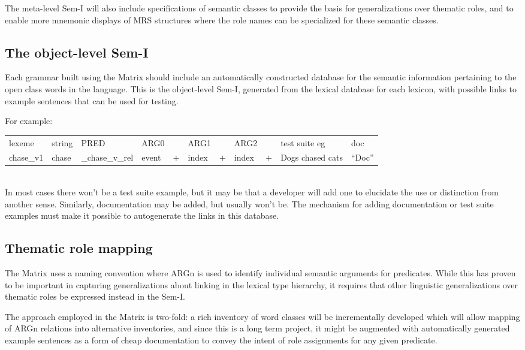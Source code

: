 \documentclass[12pt]{article}
\begin{document}
The meta-level Sem-I will also include specifications of semantic classes
to provide the basis for generalizations over thematic roles, and to enable
more mnemonic displays of MRS structures where the role names can be
specialized for these semantic classes.

\subsection{The object-level Sem-I}

Each grammar built using the Matrix should include an automatically 
constructed database for the semantic information pertaining to the open class 
words in the language.  This is the object-level Sem-I, generated from the 
lexical database for each lexicon, with possible links to example sentences
that can be used for testing.

For example:\\

\noindent
{\small
\begin{tabular}{lllllllllll}
lexeme & string & PRED & ARG0 & & ARG1 & & ARG2 & & test suite eg & doc\\
chase\_v1 & chase & \_chase\_v\_rel & event & $+$ & index & $+$ & index & $+$ & Dogs chased cats & ``Doc''
\end{tabular}
}\\

In most cases there won't be a test suite example, but it may be that a
developer will add one to elucidate the use or distinction from another sense. 
Similarly, documentation may be added, but usually won't be.
The mechanism for adding documentation or test suite examples
must make it possible to autogenerate the links in this database.


\subsection{Thematic role mapping}

The Matrix uses a naming convention where ARGn is used to identify
individual semantic arguments for predicates.  While this has proven to be
important in capturing generalizations about linking in the lexical type
hierarchy, it requires that other linguistic generalizations over thematic
roles be expressed instead in the Sem-I.

The approach employed in the Matrix is two-fold: a rich inventory
of word classes will be incrementally developed which will allow mapping
of ARGn relations into alternative inventories, and since this is
a long term project, it might be augmented with automatically
generated example sentences as a form of cheap documentation to convey the
intent of role assignments for any given predicate.
\end{document}

